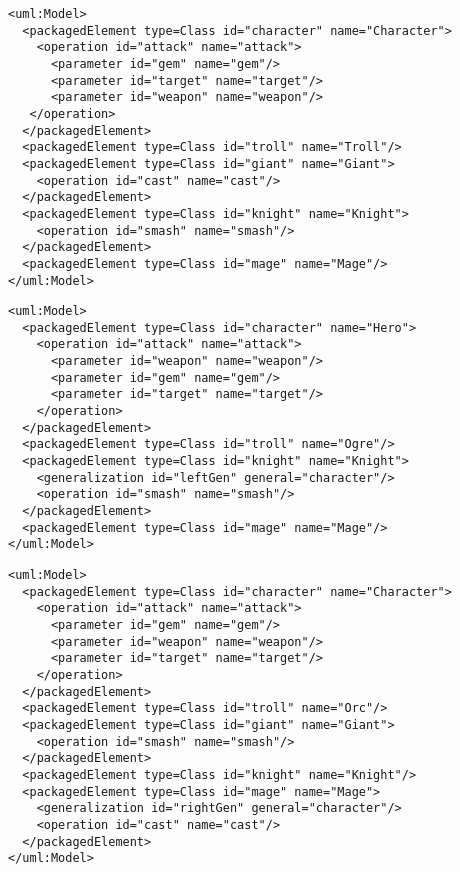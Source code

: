 \vspace{-20pt}
\begin{lstlisting}[style=xmi,caption={Simplified XMI file of the original version in Figure \ref{fig:class_diagram_origin}.},label=lst:xmimodel_origin]
<uml:Model>
  <packagedElement type=Class id="character" name="Character">
    <operation id="attack" name="attack">
      <parameter id="gem" name="gem"/>
      <parameter id="target" name="target"/>
      <parameter id="weapon" name="weapon"/>
   </operation>
  </packagedElement>
  <packagedElement type=Class id="troll" name="Troll"/>
  <packagedElement type=Class id="giant" name="Giant">
    <operation id="cast" name="cast"/>
  </packagedElement>
  <packagedElement type=Class id="knight" name="Knight">
    <operation id="smash" name="smash"/>
  </packagedElement>
  <packagedElement type=Class id="mage" name="Mage"/>
</uml:Model>
\end{lstlisting}

\vspace{-20pt}
\begin{lstlisting}[style=xmi,caption={Simplified XMI file of the left version in Figure \ref{fig:class_diagram_left}.},label=lst:xmimodel_left]
<uml:Model>
  <packagedElement type=Class id="character" name="Hero">
    <operation id="attack" name="attack">
      <parameter id="weapon" name="weapon"/>
      <parameter id="gem" name="gem"/>
      <parameter id="target" name="target"/>
    </operation>
  </packagedElement>
  <packagedElement type=Class id="troll" name="Ogre"/>
  <packagedElement type=Class id="knight" name="Knight">
    <generalization id="leftGen" general="character"/>
    <operation id="smash" name="smash"/>
  </packagedElement>
  <packagedElement type=Class id="mage" name="Mage"/>
</uml:Model>
\end{lstlisting}

\vspace{-20pt}
\begin{lstlisting}[style=xmi,caption={Simplified XMI file of the right version of Figure \ref{fig:class_diagram_right}.},label=lst:xmimodel_right]
<uml:Model>
  <packagedElement type=Class id="character" name="Character">
    <operation id="attack" name="attack">
      <parameter id="gem" name="gem"/>
      <parameter id="weapon" name="weapon"/>
      <parameter id="target" name="target"/>
    </operation>
  </packagedElement>
  <packagedElement type=Class id="troll" name="Orc"/>
  <packagedElement type=Class id="giant" name="Giant">
    <operation id="smash" name="smash"/>
  </packagedElement>
  <packagedElement type=Class id="knight" name="Knight"/>
  <packagedElement type=Class id="mage" name="Mage">
    <generalization id="rightGen" general="character"/>
    <operation id="cast" name="cast"/>
  </packagedElement>
</uml:Model>
\end{lstlisting}


